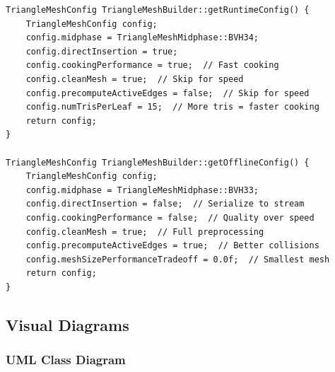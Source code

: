 \begin{lstlisting}[caption={Runtime and offline configuration presets}]
TriangleMeshConfig TriangleMeshBuilder::getRuntimeConfig() {
    TriangleMeshConfig config;
    config.midphase = TriangleMeshMidphase::BVH34;
    config.directInsertion = true;
    config.cookingPerformance = true;  // Fast cooking
    config.cleanMesh = true;  // Skip for speed
    config.precomputeActiveEdges = false;  // Skip for speed
    config.numTrisPerLeaf = 15;  // More tris = faster cooking
    return config;
}

TriangleMeshConfig TriangleMeshBuilder::getOfflineConfig() {
    TriangleMeshConfig config;
    config.midphase = TriangleMeshMidphase::BVH33;
    config.directInsertion = false;  // Serialize to stream
    config.cookingPerformance = false;  // Quality over speed
    config.cleanMesh = true;  // Full preprocessing
    config.precomputeActiveEdges = true;  // Better collisions
    config.meshSizePerformanceTradeoff = 0.0f;  // Smallest mesh
    return config;
}
\end{lstlisting}


\subsection{Visual Diagrams}

\subsubsection{UML Class Diagram}

